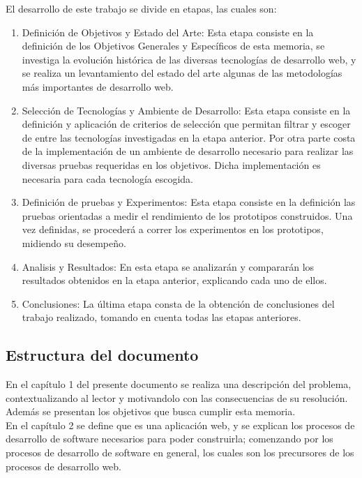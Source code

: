El desarrollo de este trabajo se divide en etapas, las cuales son:
\begin{enumerate}
 \item Definición de Objetivos y Estado del Arte: Esta etapa consiste en la definición de los Objetivos Generales 
 y Específicos de esta memoria, se investiga la evolución histórica de las diversas tecnologías de desarrollo web, 
 y se realiza un levantamiento del estado del arte algunas de las metodologías más importantes de desarrollo web.
 
 \item Selección de Tecnologías y Ambiente de Desarrollo: Esta etapa consiste en la definición y
 aplicación de criterios de selección que permitan filtrar y escoger de entre las tecnologías investigadas en la etapa 
 anterior. Por otra parte costa de la implementación de un ambiente de desarrollo necesario para realizar las diversas 
 pruebas requeridas en los objetivos. Dicha implementación es necesaria para cada tecnología escogida.
 
 \item Definición de pruebas y Experimentos: Esta etapa consiste en la definición las pruebas orientadas a medir el 
 rendimiento de los prototipos construidos. Una vez definidas, se procederá a correr los experimentos en los prototipos, 
 midiendo su desempeño.
 
 \item Analisis y Resultados: En esta etapa se analizarán y compararán los resultados obtenidos en la etapa anterior,
 explicando cada uno de ellos.
 
 \item Conclusiones: La última etapa consta de la obtención de conclusiones del trabajo realizado, tomando
 en cuenta todas las etapas anteriores.
\end{enumerate}

\subsection{Estructura del documento}

En el capítulo 1 del presente documento se realiza una descripción del problema, contextualizando 
al lector y motivandolo con las consecuencias de su resolución. Además se presentan los objetivos 
que busca cumplir esta memoria.\\

En el capítulo 2 se define que es una aplicación web, y se explican los procesos de desarrollo de 
software necesarios para poder construirla; comenzando por los procesos de desarrollo de software 
en general, los cuales son los precursores de los procesos de desarrollo web.\\

